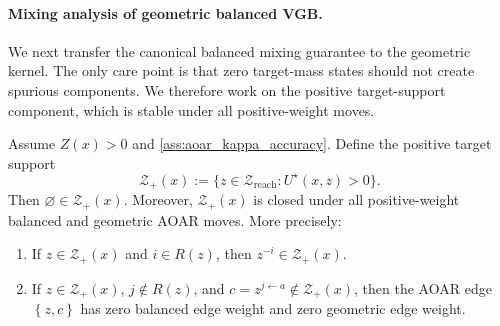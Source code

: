 \documentclass{article}
\numberwithin{theorem}{section}
\numberwithin{proposition}{section}
\numberwithin{corollary}{section}
\numberwithin{lemma}{section}
\numberwithin{conjecture}{section}
\numberwithin{remark}{section}
\numberwithin{definition}{section}
\numberwithin{assumption}{section}
\numberwithin{example}{section}
\newcommand{\calZ}{{\mathcal{Z}}}
\newcommand{\mbra}[1]{\left\{#1\right\}}
\begin{document}
\paragraph{Mixing analysis of geometric balanced VGB.}

We next transfer the canonical balanced mixing guarantee to the geometric
kernel. The only care point is that zero target-mass states should not create
spurious components. We therefore work on the positive target-support component,
which is stable under all positive-weight moves.

\begin{lemma}
\label{lem:bg_positive_support_closure}
Assume $Z(x)>0$ and \cref{ass:aoar_kappa_accuracy}. Define the positive
target support
\begin{equation*}
    \calZ_+(x)
    :=
    \bigl\{
        z\in\calZ_{\mathrm{reach}}
        :
        U^\star(x,z)>0
    \bigr\}.
\end{equation*}
Then $\varnothing\in\calZ_+(x)$. Moreover, $\calZ_+(x)$ is closed under
all positive-weight balanced and geometric AOAR moves. More precisely:

\begin{enumerate}
    \item If $z\in\calZ_+(x)$ and $i\in R(z)$, then
    $z^{-i}\in\calZ_+(x)$.

    \item If $z\in\calZ_+(x)$, $j\notin R(z)$, and
    $c=z^{j\leftarrow a}\notin\calZ_+(x)$, then the AOAR edge
    $\mbra{z,c}$ has zero balanced edge weight and zero geometric edge weight.
\end{enumerate}
\end{lemma}
\end{document}
